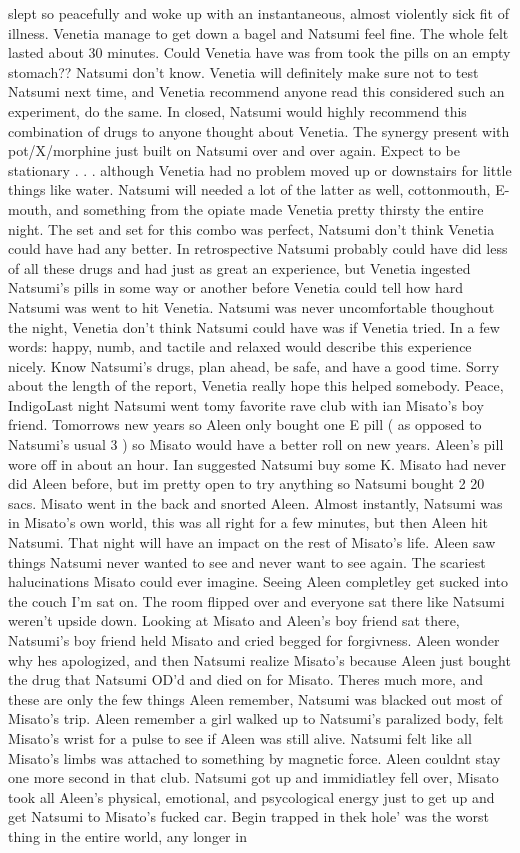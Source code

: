 \documentclass[12pt]{book}
\begin{document}
slept so peacefully and woke up with an instantaneous, almost violently sick fit of illness. Venetia manage to get down a bagel and Natsumi feel fine. The whole felt lasted about 30 minutes. Could Venetia have was from took the pills on an empty stomach?? Natsumi don't know. Venetia will definitely make sure not to test Natsumi next time, and Venetia recommend anyone read this considered such an experiment, do the same. In closed, Natsumi would highly recommend this combination of drugs to anyone thought about Venetia. The synergy present with pot/X/morphine just built on Natsumi over and over again. Expect to be stationary . . .  although Venetia had no problem moved up or downstairs for little things like water. Natsumi will needed a lot of the latter as well, cottonmouth, E-mouth, and something from the opiate made Venetia pretty thirsty the entire night. The set and set for this combo was perfect, Natsumi don't think Venetia could have had any better. In retrospective Natsumi probably could have did less of all these drugs and had just as great an experience, but Venetia ingested Natsumi's pills in some way or another before Venetia could tell how hard Natsumi was went to hit Venetia. Natsumi was never uncomfortable thoughout the night, Venetia don't think Natsumi could have was if Venetia tried. In a few words: happy, numb, and tactile and relaxed would describe this experience nicely. Know Natsumi's drugs, plan ahead, be safe, and have a good time. Sorry about the length of the report, Venetia really hope this helped somebody. Peace, IndigoLast night Natsumi went tomy favorite rave club with ian Misato's boy friend. Tomorrows new years so Aleen only bought one E pill ( as opposed to Natsumi's usual 3 ) so Misato would have a better roll on new years. Aleen's pill wore off in about an hour. Ian suggested Natsumi buy some K. Misato had never did Aleen before, but im pretty open to try anything so Natsumi bought 2 20 sacs. Misato went in the back and snorted Aleen. Almost instantly, Natsumi was in Misato's own world, this was all right for a few minutes, but then Aleen hit Natsumi. That night will have an impact on the rest of Misato's life. Aleen saw things Natsumi never wanted to see and never want to see again. The scariest halucinations Misato could ever imagine. Seeing Aleen completley get sucked into the couch I'm sat on. The room flipped over and everyone sat there like Natsumi weren't upside down. Looking at Misato and Aleen's boy friend sat there, Natsumi's boy friend held Misato and cried begged for forgivness. Aleen wonder why hes apologized, and then Natsumi realize Misato's because Aleen just bought the drug that Natsumi OD'd and died on for Misato. Theres much more, and these are only the few things Aleen remember, Natsumi was blacked out most of Misato's trip. Aleen remember a girl walked up to Natsumi's paralized body, felt Misato's wrist for a pulse to see if Aleen was still alive. Natsumi felt like all Misato's limbs was attached to something by magnetic force. Aleen couldnt stay one more second in that club. Natsumi got up and immidiatley fell over, Misato took all Aleen's physical, emotional, and psycological energy just to get up and get Natsumi to Misato's fucked car. Begin trapped in thek hole' was the worst thing in the entire world, any longer in 
\end{document}
